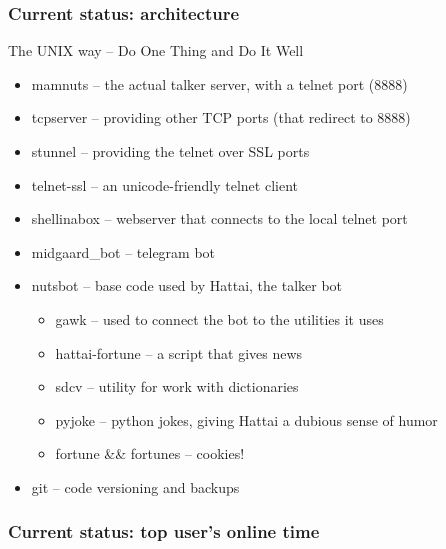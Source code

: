 \documentclass[aspectratio=169]{beamer}
\begin{document}
\begin{frame}
\frametitle{Current status: architecture}
The UNIX way -- Do One Thing and Do It Well
\begin{itemize}
  \item{} mamnuts -- the actual talker server, with a telnet port (8888)
  \item{} tcpserver -- providing other TCP ports (that redirect to 8888)
  \item{} stunnel -- providing the telnet over SSL ports
  \item{} telnet-ssl -- an unicode-friendly telnet client
  \item{} shellinabox -- webserver that connects to the local telnet port
  \item{} midgaard\_bot -- telegram bot
  \item{} nutsbot -- base code used by Hattai, the talker bot
    \begin{itemize}
      \item{} gawk -- used to connect the bot to the utilities it uses
      \item{} hattai-fortune -- a script that gives news
      \item{} sdcv -- utility for work with dictionaries
      \item{} pyjoke -- python jokes, giving Hattai a dubious sense of humor
      \item{} fortune \&\& fortunes -- cookies!
    \end{itemize}
  \item{} git -- code versioning and backups
\end{itemize}
\end{frame}

\begin{frame}
\frametitle{Current status: top user's online time}
\end{frame}
\end{document}
